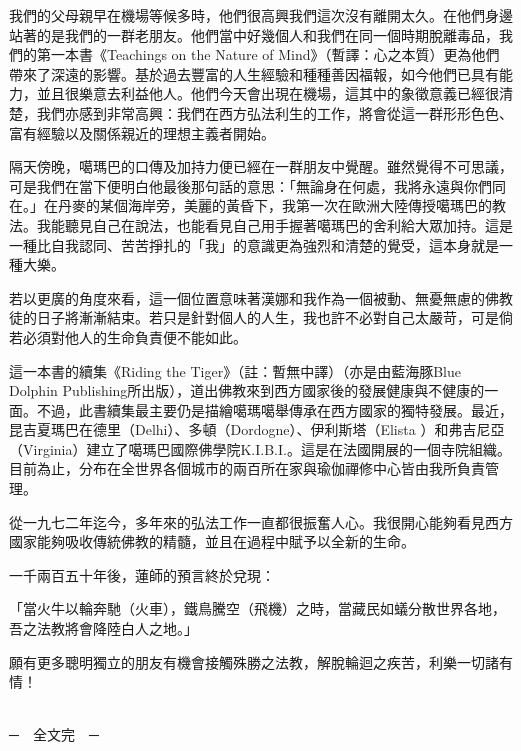 我們的父母親早在機場等候多時，他們很高興我們這次沒有離開太久。在他們身邊站著的是我們的一群老朋友。他們當中好幾個人和我們在同一個時期脫離毒品，我們的第一本書《Teachings
on the Nature of
Mind》（暫譯：心之本質）更為他們帶來了深遠的影響。基於過去豐富的人生經驗和種種善因福報，如今他們已具有能力，並且很樂意去利益他人。他們今天會出現在機場，這其中的象徵意義已經很清楚，我們亦感到非常高興：我們在西方弘法利生的工作，將會從這一群形形色色、富有經驗以及關係親近的理想主義者開始。

隔天傍晚，噶瑪巴的口傳及加持力便已經在一群朋友中覺醒。雖然覺得不可思議，可是我們在當下便明白他最後那句話的意思：「無論身在何處，我將永遠與你們同在。」在丹麥的某個海岸旁，美麗的黃昏下，我第一次在歐洲大陸傳授噶瑪巴的教法。我能聽見自己在說法，也能看見自己用手握著噶瑪巴的舍利給大眾加持。這是一種比自我認同、苦苦掙扎的「我」的意識更為強烈和清楚的覺受，這本身就是一種大樂。

若以更廣的角度來看，這一個位置意味著漢娜和我作為一個被動、無憂無慮的佛教徒的日子將漸漸結束。若只是針對個人的人生，我也許不必對自己太嚴苛，可是倘若必須對他人的生命負責便不能如此。

這一本書的續集《Riding the Tiger》（註：暫無中譯）（亦是由藍海豚Blue
Dolphin
Publishing所出版），道出佛教來到西方國家後的發展健康與不健康的一面。不過，此書續集最主要仍是描繪噶瑪噶舉傳承在西方國家的獨特發展。最近，昆吉夏瑪巴在德里（Delhi）、多頓（Dordogne）、伊利斯塔（Elista
）和弗吉尼亞（Virginia）建立了噶瑪巴國際佛學院K.I.B.I.。這是在法國開展的一個寺院組織。目前為止，分布在全世界各個城市的兩百所在家與瑜伽禪修中心皆由我所負責管理。

從一九七二年迄今，多年來的弘法工作一直都很振奮人心。我很開心能夠看見西方國家能夠吸收傳統佛教的精髓，並且在過程中賦予以全新的生命。

一千兩百五十年後，蓮師的預言終於兌現：

「當火牛以輪奔馳（火車），鐵鳥騰空（飛機）之時，當藏民如蟻分散世界各地，吾之法教將會降陸白人之地。」

願有更多聰明獨立的朋友有機會接觸殊勝之法教，解脫輪迴之疾苦，利樂一切諸有情！

　　　　　　　　　　　　　　　　　　　　　　　　　　　　　　　　　　　　　　─　全文完　─
